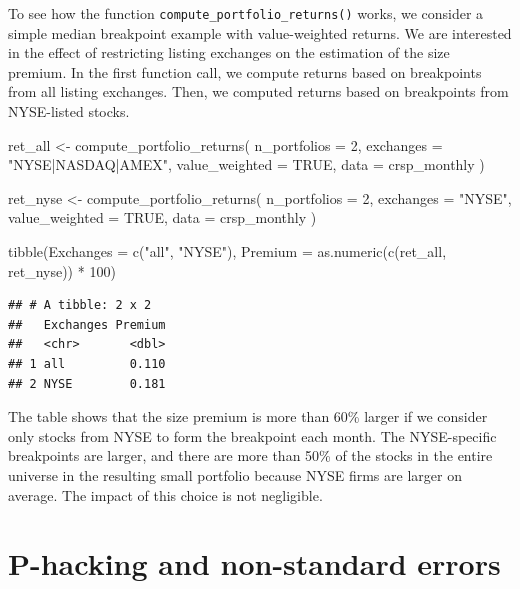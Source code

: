 \documentclass[
]{krantz}
\newenvironment{Shaded}{\begin{snugshade}}{\end{snugshade}}
\newcommand{\AttributeTok}[1]{\textcolor[rgb]{0.61,0.61,0.61}{#1}}
\newcommand{\ConstantTok}[1]{\textcolor[rgb]{0,0,0}{#1}}
\newcommand{\DecValTok}[1]{\textcolor[rgb]{0.06,0.06,0.06}{#1}}
\newcommand{\FunctionTok}[1]{\textcolor[rgb]{0,0,0}{#1}}
\newcommand{\NormalTok}[1]{#1}
\newcommand{\OtherTok}[1]{\textcolor[rgb]{0.37,0.37,0.37}{#1}}
\newcommand{\SpecialCharTok}[1]{\textcolor[rgb]{0,0,0}{#1}}
\newcommand{\StringTok}[1]{\textcolor[rgb]{0.5,0.5,0.5}{#1}}
\begin{document}
To see how the function \texttt{compute\_portfolio\_returns()} works, we consider a simple median breakpoint example with value-weighted returns. We are interested in the effect of restricting listing exchanges on the estimation of the size premium. In the first function call, we compute returns based on breakpoints from all listing exchanges. Then, we computed returns based on breakpoints from NYSE-listed stocks.

\begin{Shaded}
\begin{Highlighting}[]
\NormalTok{ret\_all }\OtherTok{\textless{}{-}} \FunctionTok{compute\_portfolio\_returns}\NormalTok{(}
  \AttributeTok{n\_portfolios =} \DecValTok{2}\NormalTok{,}
  \AttributeTok{exchanges =} \StringTok{"NYSE|NASDAQ|AMEX"}\NormalTok{,}
  \AttributeTok{value\_weighted =} \ConstantTok{TRUE}\NormalTok{,}
  \AttributeTok{data =}\NormalTok{ crsp\_monthly}
\NormalTok{)}

\NormalTok{ret\_nyse }\OtherTok{\textless{}{-}} \FunctionTok{compute\_portfolio\_returns}\NormalTok{(}
  \AttributeTok{n\_portfolios =} \DecValTok{2}\NormalTok{,}
  \AttributeTok{exchanges =} \StringTok{"NYSE"}\NormalTok{,}
  \AttributeTok{value\_weighted =} \ConstantTok{TRUE}\NormalTok{,}
  \AttributeTok{data =}\NormalTok{ crsp\_monthly}
\NormalTok{)}

\FunctionTok{tibble}\NormalTok{(}\AttributeTok{Exchanges =} \FunctionTok{c}\NormalTok{(}\StringTok{"all"}\NormalTok{, }\StringTok{"NYSE"}\NormalTok{), }\AttributeTok{Premium =} \FunctionTok{as.numeric}\NormalTok{(}\FunctionTok{c}\NormalTok{(ret\_all, ret\_nyse)) }\SpecialCharTok{*} \DecValTok{100}\NormalTok{)}
\end{Highlighting}
\end{Shaded}

\begin{verbatim}
## # A tibble: 2 x 2
##   Exchanges Premium
##   <chr>       <dbl>
## 1 all         0.110
## 2 NYSE        0.181
\end{verbatim}

The table shows that the size premium is more than 60\% larger if we consider only stocks from NYSE to form the breakpoint each month. The NYSE-specific breakpoints are larger, and there are more than 50\% of the stocks in the entire universe in the resulting small portfolio because NYSE firms are larger on average. The impact of this choice is not negligible.

\hypertarget{p-hacking-and-non-standard-errors}{%
\section{P-hacking and non-standard errors}\label{p-hacking-and-non-standard-errors}}
\end{document}
